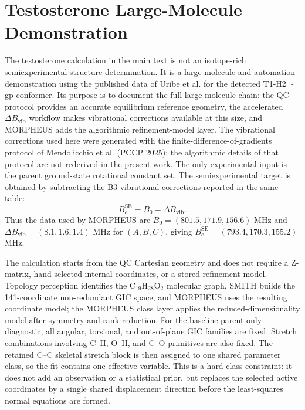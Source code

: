 \documentclass[12pt]{article}
\begin{document}
\section{Testosterone Large-Molecule Demonstration}

The testosterone calculation in the main text is not an isotope-rich
semiexperimental structure determination. It is a large-molecule and automation demonstration
using the published data of Uribe et al. for the detected T1-H2$^{-}$-gp
conformer. Its purpose is to document the full large-molecule chain: the
QC protocol provides an accurate equilibrium reference geometry, the
accelerated $\Delta B_\mathrm{vib}$ workflow makes vibrational corrections
available at this size, and MORPHEUS adds the algorithmic refinement-model layer.
The vibrational corrections used here were generated with the
finite-difference-of-gradients protocol of Mendolicchio et al. (PCCP 2025);
the algorithmic details of that protocol are not rederived in the present work.
The only experimental input is the parent ground-state rotational constant
set. The semiexperimental target is obtained by subtracting the B3 vibrational
corrections reported in the same table:
\[
B_e^\mathrm{SE}=B_0-\Delta B_\mathrm{vib}.
\]
Thus the data used by MORPHEUS are $B_0=(801.5,171.9,156.6)$ MHz and
$\Delta B_\mathrm{vib}=(8.1,1.6,1.4)$ MHz for $(A,B,C)$, giving
$B_e^\mathrm{SE}=(793.4,170.3,155.2)$ MHz.

The calculation starts from the QC Cartesian geometry and does not require
a Z-matrix, hand-selected internal coordinates, or a stored refinement model.
Topology perception identifies the C$_{19}$H$_{28}$O$_2$ molecular graph,
SMITH builds the 141-coordinate non-redundant GIC space, and
MORPHEUS uses the resulting coordinate model; the
MORPHEUS class layer applies the reduced-dimensionality model after symmetry
and rank reduction. For the baseline parent-only diagnostic, all angular,
torsional, and out-of-plane GIC families are fixed. Stretch combinations
involving C--H, O--H, and C--O primitives are also fixed. The retained C--C
skeletal stretch block is then assigned to one shared parameter class, so the
fit contains one effective variable. This is a hard class constraint: it does
not add an observation or a statistical prior, but replaces the selected active
coordinates by a single shared displacement direction before the least-squares
normal equations are formed.
\end{document}
